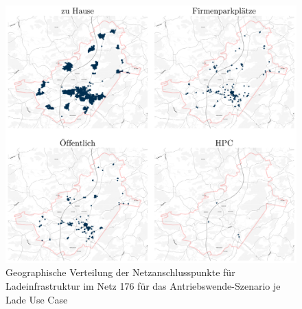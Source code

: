 \begin{figure}[H]
    \centering
    \includegraphics[width=\textwidth]{Bilder/cps_in_grid_176}
    \caption{Geographische Verteilung der Netzanschlusspunkte für Ladeinfrastruktur im Netz \num{176} für das Antriebswende-Szenario je Lade Use Case}\label{fig:cps_in_grid}
\end{figure}